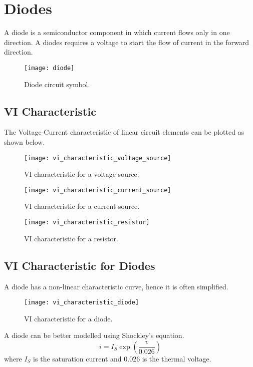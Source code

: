 \documentclass{article}
\begin{document}
\section{Diodes}
\begin{definition}[Diode]
    A diode is a semiconductor component in which current flows only in one direction. A diodes requires a voltage to start the flow of current in the forward direction.
\end{definition}
\begin{figure}[H]
    \centering
    \texttt{[image: diode]}
    \caption{Diode circuit symbol.}
\end{figure}
\subsection{VI Characteristic}
The Voltage-Current characteristic of linear circuit elements can be plotted as shown below.
\begin{figure}[H]
    \centering
    \texttt{[image: vi\_characteristic\_voltage\_source]}
    \caption{VI characteristic for a voltage source.}
\end{figure}
\begin{figure}[H]
    \centering
    \texttt{[image: vi\_characteristic\_current\_source]}
    \caption{VI characteristic for a current source.}
\end{figure}
\begin{figure}[H]
    \centering
    \texttt{[image: vi\_characteristic\_resistor]}
    \caption{VI characteristic for a resistor.}
\end{figure}
\subsection{VI Characteristic for Diodes}
A diode has a non-linear characteristic curve, hence it is often simplified.
\begin{figure}[H]
    \centering
    \texttt{[image: vi\_characteristic\_diode]}
    \caption{VI characteristic for a diode.}
\end{figure}
\begin{theorem}
    A diode can be better modelled using Shockley's equation.
    \begin{equation*}
        i = I_S \exp{\left( \frac{v}{0.026} \right)}
    \end{equation*}
    where $I_S$ is the saturation current and $0.026$ is the thermal voltage.
\end{theorem}
\end{document}
